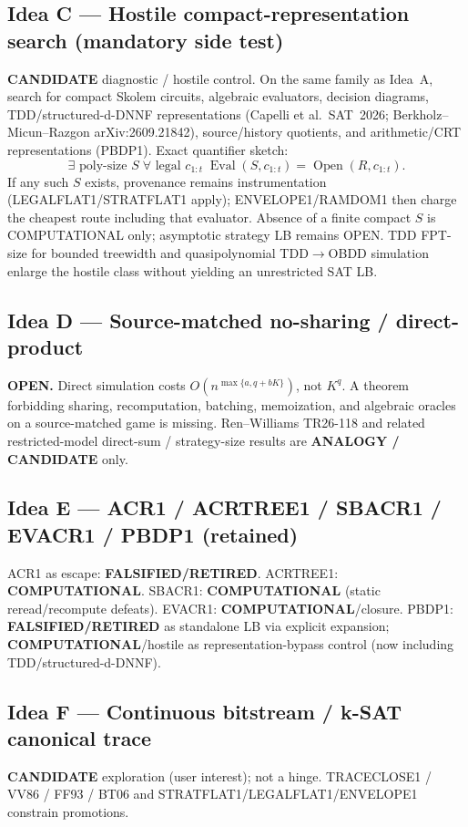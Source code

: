 \documentclass[11pt]{article}
\begin{document}
\subsection*{Idea C --- Hostile compact-representation search (mandatory side test)}
\textbf{CANDIDATE} diagnostic / hostile control. On the same family as Idea~A,
search for compact Skolem circuits, algebraic evaluators, decision diagrams,
TDD/structured-d-DNNF representations (Capelli et al.\ SAT~2026;
Berkholz--Micun--Razgon arXiv:2609.21842), source/history quotients, and
arithmetic/CRT representations (PBDP1). Exact quantifier sketch:
\[
\exists\text{ poly-size }S\;\forall\text{ legal }c_{1:t}\;
\operatorname{Eval}(S,c_{1:t})=\operatorname{Open}(R,c_{1:t}).
\]
If any such $S$ exists, provenance remains instrumentation (LEGALFLAT1/STRATFLAT1
apply); ENVELOPE1/RAMDOM1 then charge the cheapest route including that evaluator.
Absence of a finite compact $S$ is COMPUTATIONAL only; asymptotic strategy LB
remains OPEN. TDD FPT-size for bounded treewidth and quasipolynomial TDD$\to$OBDD
simulation enlarge the hostile class without yielding an unrestricted SAT LB.

\subsection*{Idea D --- Source-matched no-sharing / direct-product}
\textbf{OPEN.} Direct simulation costs $O(n^{\max\{a,q+bK\}})$, not $K^q$.
A theorem forbidding sharing, recomputation, batching, memoization, and algebraic
oracles on a source-matched game is missing. Ren--Williams TR26-118 and related
restricted-model direct-sum / strategy-size results are \textbf{ANALOGY / CANDIDATE}
only.

\subsection*{Idea E --- ACR1 / ACRTREE1 / SBACR1 / EVACR1 / PBDP1 (retained)}
ACR1 as escape: \textbf{FALSIFIED/RETIRED}.
ACRTREE1: \textbf{COMPUTATIONAL}.
SBACR1: \textbf{COMPUTATIONAL} (static reread/recompute defeats).
EVACR1: \textbf{COMPUTATIONAL}/closure.
PBDP1: \textbf{FALSIFIED/RETIRED} as standalone LB via explicit expansion;
\textbf{COMPUTATIONAL}/hostile as representation-bypass control (now including
TDD/structured-d-DNNF).

\subsection*{Idea F --- Continuous bitstream / k-SAT canonical trace}
\textbf{CANDIDATE} exploration (user interest); not a hinge. TRACECLOSE1 / VV86 /
FF93 / BT06 and STRATFLAT1/LEGALFLAT1/ENVELOPE1 constrain promotions.
\end{document}
